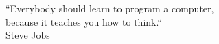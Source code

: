 \begin{epigrafe}
  \vspace*{\fill}
	\begin{flushright}
		``Everybody should learn to program a computer,\\
		because it teaches you how to think.``\\
		Steve Jobs
	\end{flushright}
\end{epigrafe}
